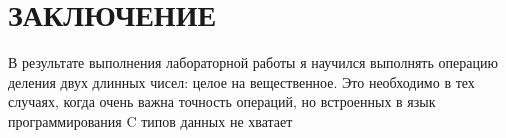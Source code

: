 \part*{ЗАКЛЮЧЕНИЕ}
В результате выполнения лабораторной работы я научился выполнять операцию деления двух длинных чисел: целое на вещественное. Это необходимо в тех случаях, когда очень важна точность операций, но встроенных в язык программирования C типов данных не хватает